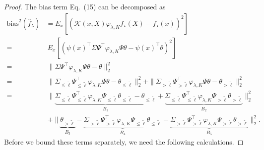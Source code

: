 \documentclass{article}
\theoremstyle{plain}
\theoremstyle{definition}
\theoremstyle{remark}
\newcommand{\green}{\color{green}}
\newcommand{\dhnote}[1]{{\color{red}[#1]} } %
\begin{document}
\begin{appendix}
\begin{proof}
The bias term Eq.~(15) can be decomposed as
\begin{equation}\label{eq derivation of bias_spe}
    \begin{aligned}
        \mathrm{bias}^2(\hat{f}_{\lambda}) &= E_{x} \left[\left( \mathscr{K}(x,X) \varphi_{\lambda, K} f_{\star}(X) -f_{\star}(x)\right)^2\right]\\
    =&~ E_{x} \left[\left( \psi(x)^{\top} \Sigma \Psi^{\top} \varphi_{\lambda, K} \Psi \theta - \psi(x)^{\top} \theta\right)^2\right]\\
    =&~ \| \Sigma \Psi^{\top} \varphi_{\lambda, K} \Psi \theta - \theta  \|_{2}^{2}\\
    =&~
    \| \Sigma_{\leq \tilde{\ell}} \Psi^{\top}_{\leq \tilde{\ell}} \varphi_{\lambda, K} \Psi \theta - \theta_{\leq \tilde{\ell}}  \|_{2}^{2} + \| \Sigma_{>\tilde{\ell}} \Psi^{\top}_{>\tilde{\ell}} \varphi_{\lambda, K} \Psi \theta - \theta_{>\tilde{\ell}}  \|_{2}^{2}\\
    =&~
    \| \underbrace{\Sigma_{\leq \tilde{\ell}} \Psi^{\top}_{\leq \tilde{\ell}} \varphi_{\lambda, K} \Psi_{\leq \tilde{\ell}} \theta_{\leq \tilde{\ell}} - \theta_{\leq \tilde{\ell}}  }_{B_{1}}+  \underbrace{\Sigma_{\leq \tilde{\ell}} \Psi^{\top}_{\leq \tilde{\ell}} \varphi_{\lambda, K} \Psi_{>\tilde{\ell}} \theta_{>\tilde{\ell}}}_{B_{2}} \|_{2}^{2}\\
    &~+
     \|\underbrace{\theta_{>\tilde{\ell}}}_{B_{3}} - \underbrace{ \Sigma_{>\tilde{\ell}} \Psi^{\top}_{>\tilde{\ell}} \varphi_{\lambda, K} \Psi_{\leq \tilde{\ell}} \theta_{\leq \tilde{\ell}} }_{B_{4}} - \underbrace{  \Sigma_{>\tilde{\ell}} \Psi^{\top}_{>\tilde{\ell}} \varphi_{\lambda, K} \Psi_{>\tilde{\ell}} \theta_{>\tilde{\ell}} }_{ B_{5}}\|_{2}^{2}.
    \end{aligned}
\end{equation}
Before we bound these terms separately, we need the following calculations.





\end{proof}
\end{appendix}
\end{document}
